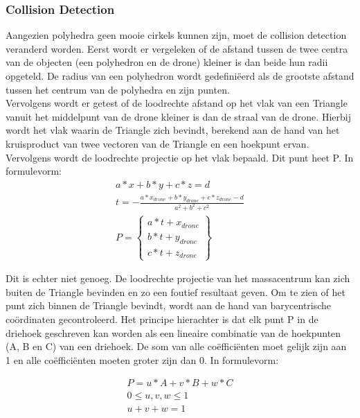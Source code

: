 \subsubsection{Collision Detection}
Aangezien polyhedra geen mooie cirkels kunnen zijn, moet de collision detection veranderd worden. Eerst wordt er vergeleken of de afstand tussen de twee centra van de objecten (een polyhedron en de drone) kleiner is dan beide hun radii opgeteld. De radius van een polyhedron wordt gedefiniëerd als de grootste afstand tussen het centrum van de polyhedra en zijn punten. \\
\noindent
Vervolgens wordt er getest of de loodrechte afstand op het vlak van een Triangle vanuit het middelpunt van de drone kleiner is dan de straal van de drone. Hierbij wordt het vlak waarin de Triangle zich bevindt, berekend aan de hand van het kruisproduct van twee vectoren van de Triangle en een hoekpunt ervan. Vervolgens wordt de loodrechte projectie op het vlak bepaald. Dit punt heet P. In formulevorm: 
\begin{gather*}
	a*x + b*y + c*z = d \\ 
	t = -\frac{a * x_{drone} + b * y_{drone} + c * z_{drone} - d}{a^2 + b^2 + c^2}  \\ P =
	\begin{Bmatrix}
	a*t + x_{drone}\\ 
	b*t + y_{drone}\\ 
	c*t + z_{drone}
	\end{Bmatrix}
\end{gather*}

\noindent
 Dit is echter niet genoeg. De loodrechte projectie van het massacentrum  kan zich buiten de Triangle bevinden en zo een foutief resultaat geven. Om te zien of het punt zich binnen de Triangle bevindt, wordt aan de hand van barycentrische coördinaten gecontroleerd. Het principe hierachter is dat elk punt P in de driehoek geschreven kan worden als een lineaire combinatie van de hoekpunten (A, B en C) van een driehoek. De som van alle coëfficiënten moet gelijk zijn aan 1 en alle coëfficiënten moeten groter zijn dan 0. In formulevorm:
 
 \begin{gather*}
 	P = u*A + v*B + w*C \\
 	0 \le u,v,w \le 1 \\
 	u + v + w = 1
 \end{gather*}



